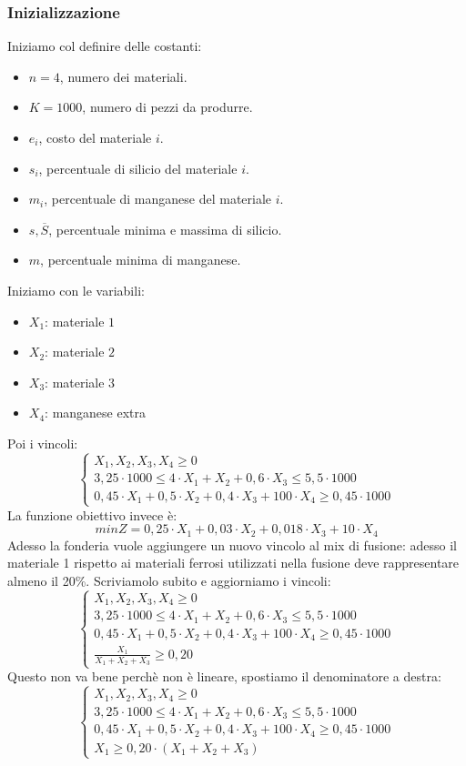 \documentclass[12pt,a4paper]{article}
\begin{document}
\subsubsection{Inizializzazione}
Iniziamo col definire delle costanti:
\begin{itemize}
    \item $n = 4$, numero dei materiali.
    \item $K = 1000$, numero di pezzi da produrre.
    \item $e_i$, costo del materiale $i$.
    \item $s_i$, percentuale di silicio del materiale $i$.
    \item $m_i$, percentuale di manganese del materiale $i$.
    \item $s,\overline{S}$, percentuale minima e massima di silicio.
    \item $m$, percentuale minima di manganese.
\end{itemize}
Iniziamo con le variabili:
\begin{itemize}
    \item \textbf{$X_1$}: materiale $1$
    \item \textbf{$X_2$}: materiale $2$
    \item \textbf{$X_3$}: materiale $3$
    \item \textbf{$X_4$}: manganese extra
\end{itemize}
Poi i vincoli:
\[
\begin{cases}
    X_1, X_2, X_3, X_4 \geq 0\\
    3,25 \cdot 1000 \leq 4 \cdot X_1 + X_2 + 0,6 \cdot X_3 \leq 5,5 \cdot 1000\\
    0,45 \cdot X_1 + 0,5 \cdot X_2 + 0,4 \cdot X_3 + 100 \cdot X_4 \geq 0,45 \cdot 1000
\end{cases}
\]
La funzione obiettivo invece è:
\[
minZ = 0,25 \cdot X_1 + 0,03 \cdot X_2 + 0,018 \cdot X_3 + 10 \cdot X_4
\]
Adesso la fonderia vuole aggiungere un nuovo vincolo al mix di fusione: adesso il materiale 1 rispetto ai materiali ferrosi utilizzati nella fusione deve rappresentare almeno il 20\%. Scriviamolo subito e aggiorniamo i vincoli:
\[
\begin{cases}
    X_1, X_2, X_3, X_4 \geq 0\\
    3,25 \cdot 1000 \leq 4 \cdot X_1 + X_2 + 0,6 \cdot X_3 \leq 5,5 \cdot 1000\\
    0,45 \cdot X_1 + 0,5 \cdot X_2 + 0,4 \cdot X_3 + 100 \cdot X_4 \geq 0,45 \cdot 1000\\
    \frac{X_1}{X_1 + X_2 + X_3} \geq 0,20
\end{cases}
\]
Questo non va bene perchè non è lineare, spostiamo il denominatore a destra:
\[
\begin{cases}
    X_1, X_2, X_3, X_4 \geq 0\\
    3,25 \cdot 1000 \leq 4 \cdot X_1 + X_2 + 0,6 \cdot X_3 \leq 5,5 \cdot 1000\\
    0,45 \cdot X_1 + 0,5 \cdot X_2 + 0,4 \cdot X_3 + 100 \cdot X_4 \geq 0,45 \cdot 1000\\
    X_1 \geq 0,20 \cdot (X_1 + X_2 + X_3)
\end{cases}
\]
\end{document}
